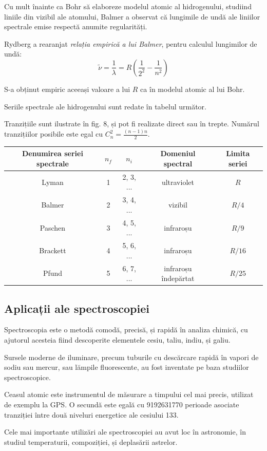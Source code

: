 Cu mult înainte ca Bohr să elaboreze modelul atomic al hidrogenului, studiind
liniile din vizibil ale atomului, Balmer a observat că lungimile de undă ale
liniilor spectrale emise respectă anumite regularități.

Rydberg a rearanjat \emph{relația empirică a lui Balmer}, pentru calculul
lungimilor de undă:
\[ \tilde{\nu} = \frac{1}{\lambda} = R\left(\frac{1}{2^2} - \frac{1}{n^2}\right) \]

S-a obținut empiric aceeași valoare a lui $R$ ca în modelul atomic al lui Bohr.

Seriile spectrale ale hidrogenului sunt redate în tabelul următor.

Tranzițiile sunt ilustrate în fig. 8, și pot fi realizate direct sau în trepte.
Numărul tranzițiilor posibile este egal cu $C_n^2 = \frac{(n-1)n}{2}$.

\begin{center}
    \renewcommand{\arraystretch}{1.5}
    \begin{tabular}{|c|c|c|c|c|}
        \hline
        \textbf{Denumirea seriei spectrale} & \boldmath$n_f$ & \boldmath$n_i$ &
        \textbf{Domeniul spectral} & \textbf{Limita seriei} \\
        \hline
        Lyman & 1 & 2, 3, ... & ultraviolet & $R$ \\
        \hline
        Balmer & 2 & 3, 4, ... & vizibil & $R/4$ \\
        \hline
        Paschen & 3 & 4, 5, ... & infraroșu & $R/9$ \\
        \hline
        Brackett & 4 & 5, 6, ... & infraroșu & $R/16$ \\
        \hline
        Pfund & 5 & 6, 7, ... & infraroșu îndepărtat & $R/25$ \\
        \hline
    \end{tabular}
\end{center}

\subsection*{Aplicații ale spectroscopiei}

Spectroscopia este o metodă comodă, precisă, și rapidă în analiza chimică, cu
ajutorul acesteia fiind descoperite elementele cesiu, taliu, indiu, și galiu.

Sursele moderne de iluminare, precum tuburile cu descărcare rapidă în vapori de
sodiu sau mercur, sau lămpile fluorescente, au fost inventate pe baza studiilor
spectroscopice.

Ceasul atomic este instrumentul de măsurare a timpului cel mai precis, utilizat
de exemplu la GPS. O secundă este egală cu 9192631770 perioade asociate
tranziției între două niveluri energetice ale cesiului 133.

Cele mai importante utilizări ale spectroscopiei au avut loc în astronomie, în
studiul temperaturii, compoziției, și deplasării astrelor.
